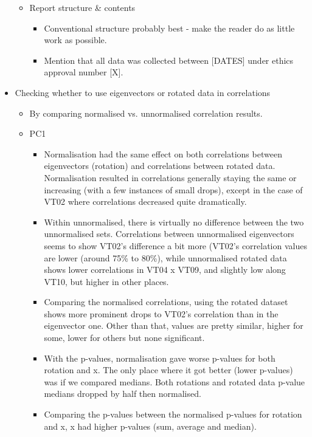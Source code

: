 \documentclass{article}
\begin{document}
\begin{itemize}
\begin{itemize}
\begin{itemize}
        \end{itemize}
        \item Report structure \& contents
        \begin{itemize}
            \item Conventional structure probably best - make the reader do as little work as possible.
            \item Mention that all data was collected between [DATES] under ethics approval number [X].
        \end{itemize}
    \end{itemize}
    \item Checking whether to use eigenvectors or rotated data in correlations
    \begin{itemize}
        \item By comparing normalised vs. unnormalised correlation results.
        \item PC1
        \begin{itemize}
            \item Normalisation had the same effect on both correlations between eigenvectors (rotation) and correlations between rotated data. Normalisation resulted in correlations generally staying the same or increasing (with a few instances of small drops), except in the case of VT02 where correlations decreased quite dramatically.
            \item Within unnormalised, there is virtually no difference between the two unnormalised sets. Correlations between unnormalised eigenvectors seems to show VT02's difference a bit more (VT02's correlation values are lower (around 75\% to 80\%), while unnormalised rotated data shows lower correlations in VT04 x VT09, and slightly low along VT10, but higher in other places.
            \item Comparing the normalised correlations, using the rotated dataset shows more prominent drops to VT02's correlation than in the eigenvector one. Other than that, values are pretty similar, higher for some, lower for others but none significant.
            \item With the p-values, normalisation gave worse p-values for both rotation and x. The only place where it got better (lower p-values) was if we compared medians. Both rotations and rotated data p-value medians dropped by half then normalised.
            \item Comparing the p-values between the normalised p-values for rotation and x, x had higher p-values (sum, average and median).

\end{itemize}
\end{itemize}
\end{itemize}
\end{document}
